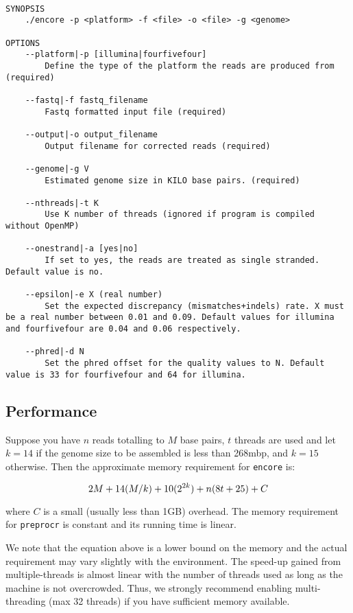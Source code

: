 \documentclass[12pt,a4paper]{report}
\begin{document}
\begin{lstlisting}

SYNOPSIS
    ./encore -p <platform> -f <file> -o <file> -g <genome> 

OPTIONS 
    --platform|-p [illumina|fourfivefour] 
        Define the type of the platform the reads are produced from (required) 

    --fastq|-f fastq_filename 
        Fastq formatted input file (required) 

    --output|-o output_filename 
        Output filename for corrected reads (required) 

    --genome|-g V 
        Estimated genome size in KILO base pairs. (required) 

    --nthreads|-t K 
        Use K number of threads (ignored if program is compiled without OpenMP)

    --onestrand|-a [yes|no] 
        If set to yes, the reads are treated as single stranded. Default value is no. 

    --epsilon|-e X (real number) 
        Set the expected discrepancy (mismatches+indels) rate. X must be a real number between 0.01 and 0.09. Default values for illumina and fourfivefour are 0.04 and 0.06 respectively. 

    --phred|-d N 
        Set the phred offset for the quality values to N. Default value is 33 for fourfivefour and 64 for illumina. 

\end{lstlisting}

\subsection{Performance}

Suppose you have $n$ reads totalling to $M$ base pairs, $t$ threads are used and let $k=14$ if the genome size to be assembled is less than 268mbp, and $k=15$ otherwise. Then the approximate memory requirement for \texttt{encore} is:

\begin{equation}
2M + 14(M/k) + 10(2^{2k}) + n(8t + 25) + C \\
\end{equation}

where $C$ is a small (usually less than 1GB) overhead. The memory requirement for \texttt{preprocr} is constant and its running time is linear.

We note that the equation above is a lower bound on the memory and the actual requirement may vary slightly with the environment. The speed-up gained from multiple-threads is almost linear with the number of threads used as long as the machine is not overcrowded. Thus, we strongly recommend enabling multi-threading (max 32 threads) if you have sufficient memory available. 
\end{document}
